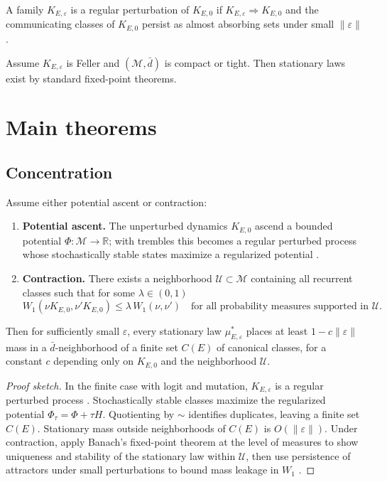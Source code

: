 \documentclass[11pt]{article}
\newcommand{\R}{\mathbb{R}}
\newcommand{\1}{\mathbbm{1}}
\newcommand{\Wone}{W_1}
\begin{document}
\begin{definition}
A family $K_{E,\varepsilon}$ is a regular perturbation of $K_{E,0}$ if $K_{E,\varepsilon} \Rightarrow K_{E,0}$ and the communicating classes of $K_{E,0}$ persist as almost absorbing sets under small $\|\varepsilon\|$ \parencite{Young1993,Kandori1993}.
\end{definition}

Assume $K_{E,\varepsilon}$ is Feller and $(\mathcal{M},\bar d)$ is compact or tight. Then stationary laws exist by standard fixed-point theorems.

\section{Main theorems}
\subsection{Concentration}
\begin{theorem}\label{thm:concentration}
Assume either potential ascent or contraction:
\begin{enumerate}[leftmargin=2em]
    \item \textbf{Potential ascent.} The unperturbed dynamics $K_{E,0}$ ascend a bounded potential $\Phi:\mathcal{M} \to \R$; with trembles this becomes a regular perturbed process whose stochastically stable states maximize a regularized potential \parencite{Young1993,Kandori1993}.
    \item \textbf{Contraction.} There exists a neighborhood $\mathcal{U} \subset \mathcal{M}$ containing all recurrent classes such that for some $\lambda \in (0,1)$
    \[
    \Wone(\nu K_{E,0}, \nu' K_{E,0}) \le \lambda \, \Wone(\nu,\nu') \quad \text{for all probability measures supported in } \mathcal{U}.
    \]
\end{enumerate}
Then for sufficiently small $\varepsilon$, every stationary law $\mu^*_{E,\varepsilon}$ places at least $1 - c \|\varepsilon\|$ mass in a $\bar d$-neighborhood of a finite set $C(E)$ of canonical classes, for a constant $c$ depending only on $K_{E,0}$ and the neighborhood $\mathcal{U}$.
\end{theorem}

\begin{proof}[Proof sketch]
In the finite case with logit and mutation, $K_{E,\varepsilon}$ is a regular perturbed process \parencite{Young1993,Kandori1993}. Stochastically stable classes maximize the regularized potential $\Phi_{\tau} = \Phi + \tau H$. Quotienting by $\sim$ identifies duplicates, leaving a finite set $C(E)$. Stationary mass outside neighborhoods of $C(E)$ is $O(\|\varepsilon\|)$. Under contraction, apply Banach's fixed-point theorem at the level of measures to show uniqueness and stability of the stationary law within $\mathcal{U}$, then use persistence of attractors under small perturbations to bound mass leakage in $\Wone$ \parencite{Villani2009}.
\end{proof}
\end{document}
